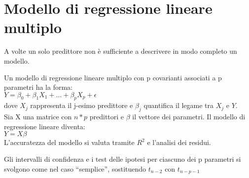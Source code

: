 \section{Modello di regressione lineare multiplo}

A volte un solo predittore non è sufficiente a descrivere in modo completo
un modello.

Un modello di regressione lineare multiplo con p covarianti associati a p
parametri ha la forma:\\

$Y = \beta_0 + \beta_1X_1 + ... + \beta_pX_p + \epsilon$\\

dove $X_j$ rappresenta il j-esimo predittore e $\beta_j$ quantifica il legame
tra $X_j$ e $Y$.\\

Sia X una matrice con $n*p$ predittori e $\beta$ il vettore dei parametri.
Il modello di regressione lineare diventa:\\

$Y = X\beta$\\

L'accuratezza del modello si valuta tramite $R^2$ e l'analisi dei residui.

Gli intervalli di confidenza e i test delle ipotesi per ciascuno dei p parametri
si svolgono come nel caso ``semplice'', sostituendo $t_{n-2}$ con $t_{n-p-1}$



